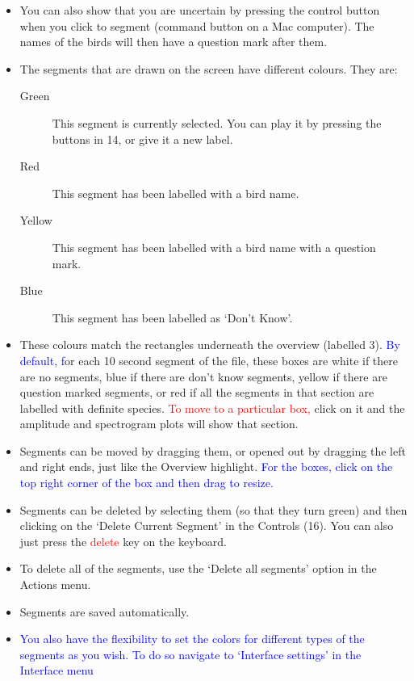 \documentclass{article}
\begin{document}
\begin{itemize}
\item You can also show that you are uncertain by pressing the control button when you click to segment (command button on a Mac computer). The names of the birds will then have a question mark after them. 

\item The segments that are drawn on the screen have different colours. They are:
	\begin{description} 
	\item[Green] This segment is currently selected. You can play it by pressing the buttons in 14, or give it a new label. 
	\item[Red] This segment has been labelled with a bird name.
	\item[Yellow] This segment has been labelled with a bird name with a question mark.
	\item[Blue] This segment has been labelled as `Don't Know'.
	\end{description}

\item These colours match the rectangles underneath the overview (labelled 3). \textcolor{blue}{By default, f}or each 10 second segment of the file, these boxes are white if there are no segments, blue if there are don't know segments, yellow if there are question marked segments, or red if all the segments in that section are labelled with definite species. \textcolor{red}{To move to a particular box,} click on it and the amplitude and spectrogram plots will show that section. 

\item Segments can be moved by dragging them, or opened out by dragging the left and right ends, just like the Overview highlight. \textcolor{blue}{For the boxes, click on the top right corner of the box and then drag to resize.}

\item Segments can be deleted by selecting them (so that they turn green) and then clicking on the `Delete Current Segment' in the Controls (16). You can also just press the \textcolor{red}{delete} key on the keyboard. 

\item To delete all of the segments, use the `Delete all segments' option in the Actions menu. 

\item Segments are saved automatically. 

\item \textcolor{blue}{You also have the flexibility to set the colors for different types of the segments as you wish. To do so navigate to `Interface settings' in the Interface menu}
\end{itemize}
\end{document}
